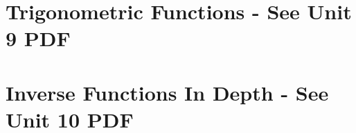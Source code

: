 \documentclass[handout]{xourse}
\begin{document}
\part{Trigonometric Functions - See Unit 9 PDF}



%
%



%
%
\part{Inverse Functions In Depth - See Unit 10 PDF}
%
%
\end{document}
